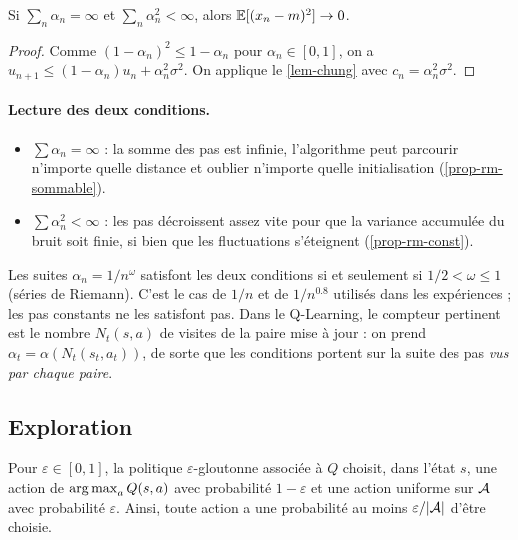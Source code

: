 \begin{theoreme}\label{thm-rm}
Si $\sum_n\alpha_n=\infty$ et $\sum_n\alpha_n^2<\infty$, alors $\mathbb{E}[(x_n-m)^2]\to0$.
\end{theoreme}
\begin{proof}
Comme $(1-\alpha_n)^2\le1-\alpha_n$ pour $\alpha_n\in[0,1]$, on a $u_{n+1}\le(1-\alpha_n)u_n+\alpha_n^2\sigma^2$. On applique le \cref{lem-chung} avec $c_n=\alpha_n^2\sigma^2$.
\end{proof}

\paragraph{Lecture des deux conditions.}
\begin{itemize}
\item $\sum\alpha_n=\infty$ : la somme des pas est infinie, l'algorithme peut parcourir n'importe quelle distance et oublier n'importe quelle initialisation (\cref{prop-rm-sommable}).
\item $\sum\alpha_n^2<\infty$ : les pas décroissent assez vite pour que la variance accumulée du bruit soit finie, si bien que les fluctuations s'éteignent (\cref{prop-rm-const}).
\end{itemize}
Les suites $\alpha_n=1/n^\omega$ satisfont les deux conditions si et seulement si $1/2<\omega\le1$ (séries de Riemann). C'est le cas de $1/n$ et de $1/n^{0.8}$ utilisés dans les expériences ; les pas constants ne les satisfont pas. Dans le Q-Learning, le compteur pertinent est le nombre $N_t(s,a)$ de visites de la paire mise à jour : on prend $\alpha_t=\alpha(N_t(s_t,a_t))$, de sorte que les conditions portent sur la suite des pas \emph{vus par chaque paire}.

\subsection{Exploration}\label{sec-exploration}

\begin{definition}
Pour $\varepsilon\in[0,1]$, la politique $\varepsilon$-gloutonne associée à $Q$ choisit, dans l'état $s$, une action de $\operatorname*{arg\,max}_aQ(s,a)$ avec probabilité $1-\varepsilon$ et une action uniforme sur $\mathcal{A}$ avec probabilité $\varepsilon$. Ainsi, toute action a une probabilité au moins $\varepsilon/|\mathcal{A}|$ d'être choisie.
\end{definition}

